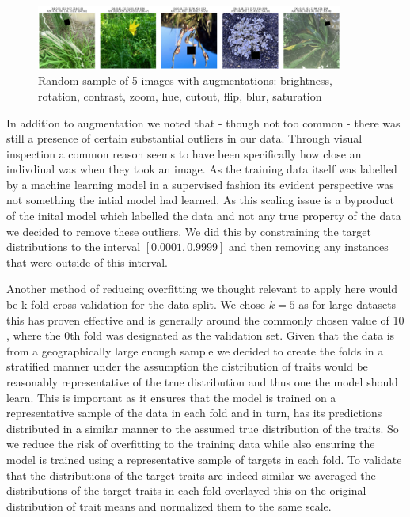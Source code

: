 \documentclass[12pt,a4paper,oneside]{article}
\begin{document}
\begin{figure}[!h]
    \centering
    \includegraphics[width=0.9\textwidth]{assets/after_aug_img.png}
    \caption{Random sample of 5 images with augmentations: brightness, rotation, contrast, zoom, hue, cutout, flip, blur, saturation}
\end{figure}


\smallskip 
In addition to augmentation we noted that - though not too common - there was still a presence of certain substantial outliers in our data. Through visual inspection a common reason seems to have been specifically how close an indivdiual was when they took an image. As the training data itself was labelled by a machine learning model in a supervised fashion its evident perspective was not something the intial model had learned. As this scaling issue is a byproduct of the inital model which labelled the data and not any true property of the data we decided to remove these outliers. We did this by constraining the target distributions to the interval $[0.0001, 0.9999]$ and then removing any instances that were outside of this interval.

\smallskip
Another method of reducing overfitting we thought relevant to apply here would be k-fold cross-validation for the data split. We chose $k=5$ as for large datasets this has proven effective \cite{Marcot2021} and is generally around the commonly chosen value of 10 \cite{kequal10isgood}, where the 0th fold was designated as the validation set. Given that the data is from a geographically large enough sample we decided to create the folds in a stratified manner under the assumption the distribution of traits would be reasonably representative of the true distribution and thus one the model should learn. This is important as it ensures that the model is trained on a representative sample of the data in each fold and in turn, has its predictions distributed in a similar manner to the assumed true distribution of the traits. So we reduce the risk of overfitting to the training data while also ensuring the model is trained using a representative sample of targets in each fold. To validate that the distributions of the target traits are indeed similar we averaged the distributions of the target traits in each fold overlayed this on the original distribution of trait means and normalized them to the same scale.  
\end{document}
